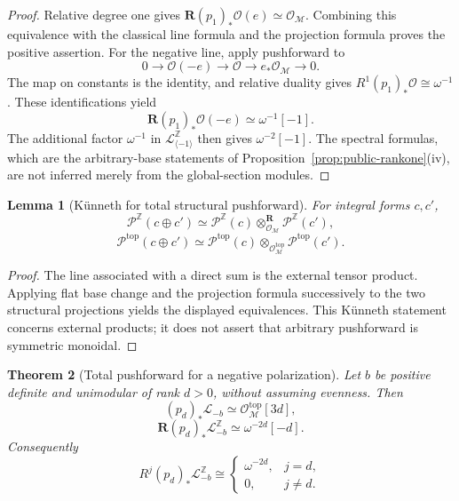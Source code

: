 \documentclass[11pt,a4paper]{amsart}
\newcommand{\Z}{\mathbb Z}
\newcommand{\cM}{\mathcal M}
\newcommand{\cL}{\mathcal L}
\newcommand{\cO}{\mathcal O}
\theoremstyle{plain}
\newtheorem{theorem}{Theorem}[section]
\newtheorem{lemma}[theorem]{Lemma}
\theoremstyle{definition}
\theoremstyle{remark}
\begin{document}
\begin{proof}
Relative degree one gives $\mathbf R(p_1)_*\cO(e)\simeq\cO_{\cM}$.
Combining this equivalence with the classical line formula and the
projection formula proves the positive assertion. For the negative line,
apply pushforward to
\[
 0\longrightarrow\cO(-e)\longrightarrow\cO\longrightarrow e_*\cO_{\cM}\longrightarrow0.
\]
The map on constants is the identity, and relative duality gives
$R^1(p_1)_*\cO\cong\omega^{-1}$. These identifications yield
\[
 \mathbf R(p_1)_*\cO(-e)\simeq\omega^{-1}[-1].
\]
The additional factor $\omega^{-1}$ in
$\cL_{\langle-1\rangle}^{\Z}$ then gives $\omega^{-2}[-1]$.
The spectral formulas, which are the arbitrary-base statements of
Proposition~\ref{prop:public-rankone}(iv), are not inferred merely
from the global-section modules.
\end{proof}

\begin{lemma}[K\"unneth for total structural pushforward]\label{lem:push-kunneth}
For integral forms $c,c'$,
\[
 \mathcal P^{\Z}(c\oplus c')
 \simeq
 \mathcal P^{\Z}(c)\otimes^{\mathbf R}_{\cO_{\cM}}\mathcal P^{\Z}(c'),
\]
\[
 \mathcal P^{\mathrm{top}}(c\oplus c')
 \simeq
 \mathcal P^{\mathrm{top}}(c)\otimes_{\cO_{\cM}^{\mathrm{top}}}\mathcal P^{\mathrm{top}}(c').
\]
\end{lemma}

\begin{proof}
The line associated with a direct sum is the external tensor product.
Applying flat base change and the projection formula successively to the
two structural projections yields the displayed equivalences. This
K\"unneth statement concerns external products; it does not assert that
arbitrary pushforward is symmetric monoidal.
\end{proof}

\begin{theorem}[Total pushforward for a negative polarization]\label{thm:negative-push}
Let $b$ be positive definite and unimodular of rank $d>0$,
without assuming evenness. Then
\begin{equation}\label{eq:negative-push-top}
 (p_d)_*\cL_{-b}\simeq\cO_{\cM}^{\mathrm{top}}[3d],
\end{equation}
\begin{equation}\label{eq:negative-push-classical}
 \mathbf R(p_d)_*\cL_{-b}^{\Z}\simeq\omega^{-2d}[-d].
\end{equation}
Consequently
\[
 R^j(p_d)_*\cL_{-b}^{\Z}\cong
 \begin{cases}
  \omega^{-2d},&j=d,\\
  0,&j\ne d.
 \end{cases}
\]
\end{theorem}
\end{document}
